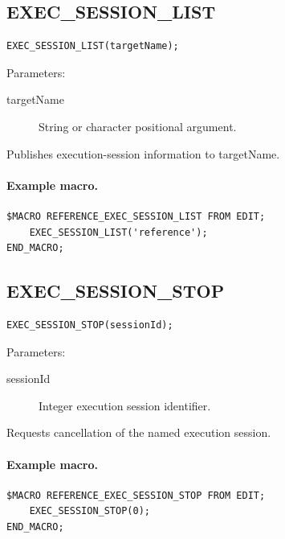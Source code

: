 \documentclass[a4paper,10pt,twoside,openany]{book}
\newenvironment{mrmacextension}{\begin{changebar}}{\end{changebar}}
\begin{document}
\begin{mrmacextension}
\label{prim:procedure-exec-session-list}
\subsection*{EXEC\_SESSION\_LIST}
\begin{verbatim}
EXEC_SESSION_LIST(targetName);
\end{verbatim}
Parameters:
\begin{description}
\item[targetName] String or character positional argument.
\end{description}

Publishes execution-session information to targetName.

\paragraph{Example macro.}
\begin{verbatim}
$MACRO REFERENCE_EXEC_SESSION_LIST FROM EDIT;
    EXEC_SESSION_LIST('reference');
END_MACRO;
\end{verbatim}
\end{mrmacextension}

\begin{mrmacextension}
\label{prim:procedure-exec-session-stop}
\subsection*{EXEC\_SESSION\_STOP}
\begin{verbatim}
EXEC_SESSION_STOP(sessionId);
\end{verbatim}
Parameters:
\begin{description}
\item[sessionId] Integer execution session identifier.
\end{description}

Requests cancellation of the named execution session.

\paragraph{Example macro.}
\begin{verbatim}
$MACRO REFERENCE_EXEC_SESSION_STOP FROM EDIT;
    EXEC_SESSION_STOP(0);
END_MACRO;
\end{verbatim}
\end{mrmacextension}
\end{document}
